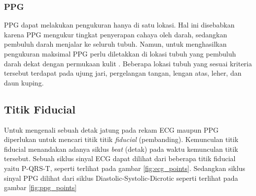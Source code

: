 \subsubsection{PPG}
PPG dapat melakukan pengukuran hanya di satu lokasi. Hal ini disebabkan karena PPG mengukur tingkat penyerapan cahaya oleh darah, sedangkan pembuluh darah menjalar ke seluruh tubuh. Namun, untuk menghasilkan pengukuran maksimal PPG perlu diletakkan di lokasi tubuh yang pembuluh darah dekat dengan permukaan kulit \cite{ppg_placement}\cite{ppg_placement2}. Beberapa lokasi tubuh yang sesuai kriteria tersebut terdapat pada ujung jari, pergelangan tangan, lengan atas, leher, dan daun kuping.


\subsection{Titik Fiducial}
Untuk mengenali sebuah detak jatung pada rekam ECG maupun PPG diperlukan untuk mencari titik titik \textit{fiducial} (pembanding). Kemunculan titik fiducial menandakan adanya siklus \textit{beat} (detak) pada waktu kemunculan titik tersebut. Sebuah siklus sinyal ECG dapat dilihat dari beberapa titik fiducial yaitu P-QRS-T, seperti terlihat pada gambar \ref{fig:ecg_points}. Sedangkan siklus sinyal PPG dilihat dari siklus Diastolic-Systolic-Dicrotic seperti terlihat pada gambar \ref{fig:ppg_points}

